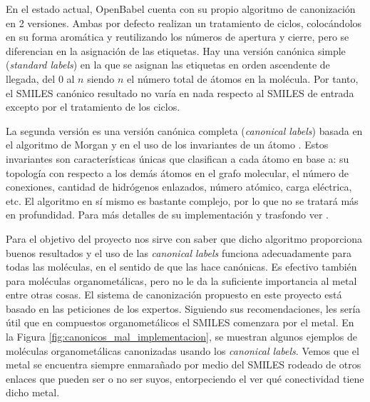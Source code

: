 En el estado actual, OpenBabel cuenta con su propio algoritmo de canonización en 2 versiones. Ambas por defecto realizan un tratamiento de ciclos, colocándolos en su forma aromática y reutilizando los números de apertura y cierre, pero se diferencian en la asignación de las etiquetas. Hay una versión canónica simple (\textit{standard labels}) en la que se asignan las etiquetas en orden ascendente de llegada, del 0 al $n$ siendo $n$ el número total de átomos en la molécula. Por tanto, el SMILES canónico resultado no varía en nada respecto al SMILES de entrada excepto por el tratamiento de los ciclos. 

La segunda versión es una versión canónica completa (\textit{canonical labels}) basada en el algoritmo de Morgan y en el uso de los invariantes de un átomo \cite{vogt_powerpoint, apodaca_computing_2019}. Estos invariantes son características únicas que clasifican a cada átomo en base a: su topología con respecto a los demás átomos en el grafo molecular, el número de conexiones, cantidad de hidrógenos enlazados, número atómico, carga eléctrica, etc. El algoritmo en sí mismo es bastante complejo, por lo que no se tratará más en profundidad. Para más detalles de su implementación y trasfondo ver \cite{weininger_smiles_1989, canonical_coding_algorithm, jochum_canonical_1977, vogt_powerpoint}. 

Para el objetivo del proyecto nos sirve con saber que dicho algoritmo proporciona buenos resultados y el uso de las \textit{canonical labels} funciona adecuadamente para todas las moléculas, en el sentido de que las hace canónicas. Es efectivo también para moléculas organometálicas, pero no le da la suficiente importancia al metal entre otras cosas. El sistema de canonización propuesto en este proyecto está basado en las peticiones de los expertos. Siguiendo sus recomendaciones, les sería útil que en compuestos organometálicos el SMILES comenzara por el metal. En la Figura \ref{fig:canonicos_mal_implementacion}, se muestran algunos ejemplos de moléculas organometálicas canonizadas usando los \textit{canonical labels}. Vemos que el metal se encuentra siempre enmarañado por medio del SMILES rodeado de otros enlaces que pueden ser o no ser suyos, entorpeciendo el ver qué conectividad tiene dicho metal. 


